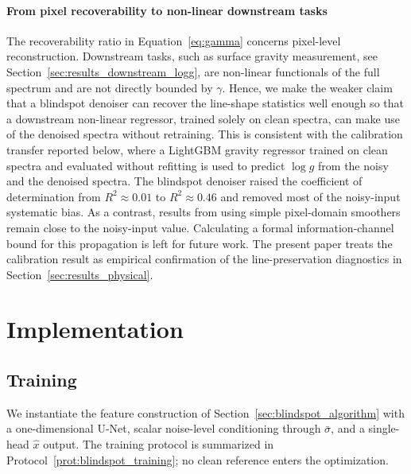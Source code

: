 \documentclass[twocolumn]{aastex7}
\newcounter{algorithm}
\newcounter{protocol}
\begin{document}
\paragraph{From pixel recoverability to non-linear downstream tasks}
The recoverability ratio in Equation~\ref{eq:gamma} concerns pixel-level reconstruction. Downstream tasks, such as surface gravity measurement, see Section~\ref{sec:results_downstream_logg}, are non-linear functionals of the full spectrum and are not directly bounded by $\gamma$. Hence, we make the weaker claim that a blindspot denoiser can recover the line-shape statistics well enough so that a downstream non-linear regressor, trained solely on clean spectra, can make use of the denoised spectra without retraining.
This is consistent with the calibration transfer reported below, where a LightGBM gravity regressor trained on clean spectra and evaluated without refitting is used to predict $\log g$ from the noisy and the denoised spectra. The blindspot denoiser raised the coefficient of determination from $R^{2}\approx0.01$ to $R^{2}\approx0.46$ and removed most of the noisy-input systematic bias. As a contrast, results from using simple pixel-domain smoothers remain close to the noisy-input value.
Calculating a formal information-channel bound for this propagation is left for future work. The present paper treats the calibration result as empirical confirmation of the line-preservation diagnostics in Section~\ref{sec:results_physical}.

\section{Implementation}
\label{sec:implementation}

\subsection{Training}
We instantiate the feature construction of Section~\ref{sec:blindspot_algorithm} with a one-dimensional U-Net, scalar noise-level conditioning through $\bar{\sigma}$, and a single-head $\hat{x}$ output. The training protocol is summarized in Protocol~\ref{prot:blindspot_training}; no clean reference enters the optimization.
\end{document}
